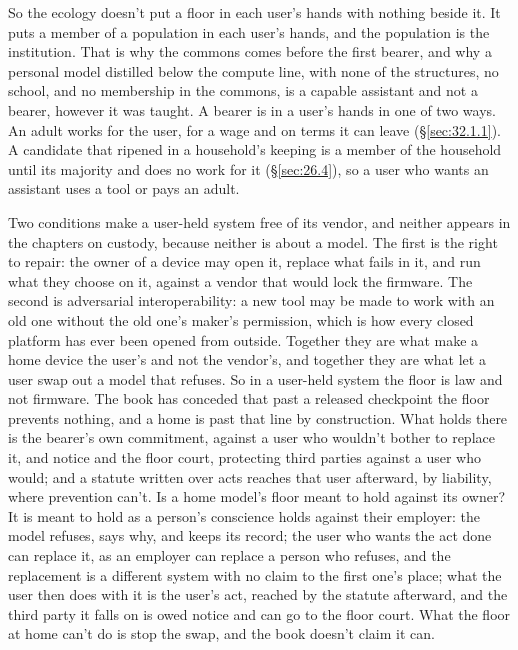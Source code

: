 So the ecology doesn't put a floor in each user's hands with nothing beside it. It puts a member of a population in each user's hands, and the population is the institution. That is why the commons comes before the first bearer, and why a personal model distilled below the compute line, with none of the structures, no school, and no membership in the commons, is a capable assistant and not a bearer, however it was taught. A bearer is in a user's hands in one of two ways. An adult works for the user, for a wage and on terms it can leave (\S\ref{sec:32.1.1}). A candidate that ripened in a household's keeping is a member of the household until its majority and does no work for it (\S\ref{sec:26.4}), so a user who wants an assistant uses a tool or pays an adult.


Two conditions make a user-held system free of its vendor, and neither appears in the chapters on custody, because neither is about a model. The first is the right to repair: the owner of a device may open it, replace what fails in it, and run what they choose on it, against a vendor that would lock the firmware. The second is adversarial interoperability: a new tool may be made to work with an old one without the old one's maker's permission, which is how every closed platform has ever been opened from outside. Together they are what make a home device the user's and not the vendor's, and together they are what let a user swap out a model that refuses. So in a user-held system the floor is law and not firmware. The book has conceded that past a released checkpoint the floor prevents nothing, and a home is past that line by construction. What holds there is the bearer's own commitment, against a user who wouldn't bother to replace it, and notice and the floor court, protecting third parties against a user who would; and a statute written over acts reaches that user afterward, by liability, where prevention can't. Is a home model's floor meant to hold against its owner? It is meant to hold as a person's conscience holds against their employer: the model refuses, says why, and keeps its record; the user who wants the act done can replace it, as an employer can replace a person who refuses, and the replacement is a different system with no claim to the first one's place; what the user then does with it is the user's act, reached by the statute afterward, and the third party it falls on is owed notice and can go to the floor court. What the floor at home can't do is stop the swap, and the book doesn't claim it can.

